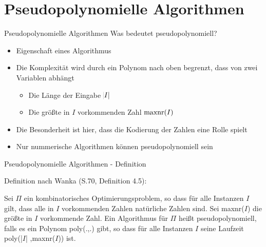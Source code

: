 \section{Pseudopolynomielle Algorithmen}

\begin{frame}{Pseudopolynomielle Algorithmen}
Was bedeutet pseudopolynomiell?

\begin{itemize}
   	\item Eigenschaft eines Algorithmus
	\item Die Komplexität wird durch ein Polynom nach oben begrenzt, dass von zwei Variablen abhängt
    \begin{itemize}
        \item Die Länge der Eingabe $\abs{I}$
        \item Die größte in $I$ vorkommenden Zahl $\operatorname{maxnr}(I)$
    \end{itemize}
    \item Die Besonderheit ist hier, dass die Kodierung der Zahlen eine Rolle spielt
    \item Nur nummerische Algorithmen können pseudopolynomiell sein
\end{itemize}
\end{frame}

\begin{frame}{Pseudopolynomielle Algorithmen - Definition}
	
	Definition nach Wanka (S.70, Definition 4.5): \newline
	
	Sei $\Pi$ ein kombinatorisches Optimierungsproblem, so dass für alle Instanzen $I$ gilt, dass alle in $I$ vorkommenden Zahlen natürliche Zahlen sind. Sei maxnr($I$) die größte in $I$ vorkommende Zahl. Ein Algorithmus für $\Pi$ heißt pseudopolynomiell, falls es ein Polynom poly(.,.)  gibt, so 
	dass für alle Instanzen $I$ seine Laufzeit poly(|$I$| ,maxnr($I$)) ist. 
	
\end{frame}

